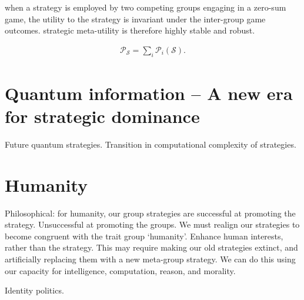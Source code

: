 \documentclass[aps,rmp,twocolumn,amsmath,amssymb,nofootinbib,superscriptaddress]{revtex4}
\begin{document}
when a strategy is employed by two competing groups engaging in a zero-sum game, the utility to the strategy is invariant under the inter-group game outcomes. strategic meta-utility is therefore highly stable and robust.

\begin{align}
\mathcal{P}_\mathcal{S} = \sum_i \mathcal{P}_i(\mathcal{S}).
\end{align}


\section{Quantum information -- A new era for strategic dominance}

Future quantum strategies. Transition in computational complexity of strategies.

\section{Humanity}

Philosophical: for humanity, our group strategies are successful at promoting the strategy. Unsuccessful at promoting the groups. We must realign our strategies to become congruent with the trait group `humanity'. Enhance human interests, rather than the strategy. This may require making our old strategies extinct, and artificially replacing them with a new meta-group strategy. We can do this using our capacity for intelligence, computation, reason, and morality.

Identity politics.
\end{document}
